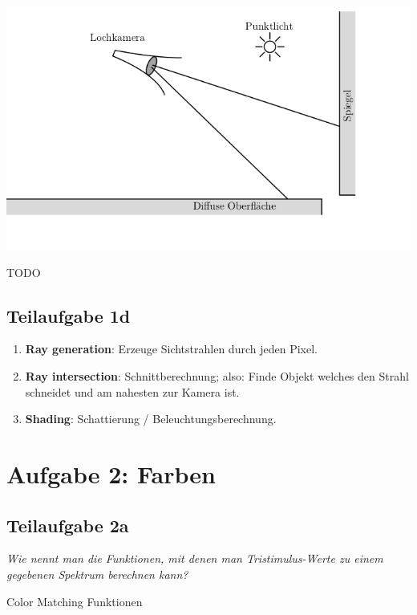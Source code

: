 \documentclass[a4paper]{scrartcl}
\begin{document}
\includegraphics*[width=\linewidth, keepaspectratio]{1c.png}

TODO

\subsection*{Teilaufgabe 1d}
\begin{enumerate}
    \item \textbf{Ray generation}: Erzeuge Sichtstrahlen durch jeden Pixel.
    \item \textbf{Ray intersection}: Schnittberechnung; also: Finde Objekt
          welches den Strahl schneidet und am nahesten zur Kamera ist.
    \item \textbf{Shading}: Schattierung / Beleuchtungsberechnung.
\end{enumerate}

\section*{Aufgabe 2: Farben}
\subsection*{Teilaufgabe 2a}
\textit{Wie nennt man die Funktionen, mit denen man Tristimulus-Werte zu einem gegebenen Spektrum berechnen kann?}

Color Matching Funktionen
\end{document}
